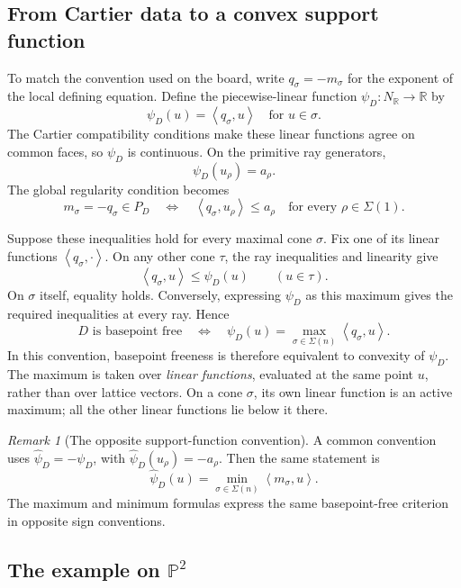 \documentclass[11pt]{article}
\theoremstyle{definition}
\theoremstyle{remark}
\newtheorem{Rmk}{Remark}
\newcommand{\Sg}{\Sigma}
\newcommand{\braket}[2]{\left\langle #1,#2\right\rangle}
\newcommand{\bP}{\mathbb{P}}
\newcommand{\bR}{\mathbb{R}}
\begin{document}
\subsection{From Cartier data to a convex support function}

To match the convention used on the board, write
\(q_\sigma=-m_\sigma\) for the exponent of the local defining equation.
Define the piecewise-linear function \(\psi_D:N_\bR\to\bR\) by
\[
    \psi_D(u)=\braket{q_\sigma}{u}
    \quad\text{for }u\in\sigma.
\]
The Cartier compatibility conditions make these linear functions agree
on common faces, so \(\psi_D\) is continuous. On the primitive ray
generators,
\[
    \psi_D(u_\rho)=a_\rho.
\]
The global regularity condition becomes
\[
    m_\sigma=-q_\sigma\in P_D
    \quad\Longleftrightarrow\quad
    \braket{q_\sigma}{u_\rho}\leq a_\rho
    \quad\text{for every }\rho\in\Sg(1).
\]

Suppose these inequalities hold for every maximal cone \(\sigma\).
Fix one of its linear functions \(\braket{q_\sigma}{\cdot}\).
On any other cone \(\tau\), the ray inequalities and linearity give
\[
    \braket{q_\sigma}{u}\leq\psi_D(u)
    \qquad(u\in\tau).
\]
On \(\sigma\) itself, equality holds. Conversely, expressing \(\psi_D\)
as this maximum gives the required inequalities at every ray. Hence
\[
    \boxed{D\text{ is basepoint free}
    \quad\Longleftrightarrow\quad
    \psi_D(u)=\max_{\sigma\in\Sg(n)}\braket{q_\sigma}{u}.}
\]
In this convention, basepoint freeness is therefore equivalent to
convexity of \(\psi_D\). The maximum is taken over \emph{linear
functions}, evaluated at the same point \(u\), rather than over lattice
vectors. On a cone \(\sigma\), its own linear function is an active
maximum; all the other linear functions lie below it there.

\begin{Rmk}[The opposite support-function convention]
    A common convention uses \(\widehat\psi_D=-\psi_D\), with
    \(\widehat\psi_D(u_\rho)=-a_\rho\). Then the same statement is
    \[
        \widehat\psi_D(u)=
        \min_{\sigma\in\Sg(n)}\braket{m_\sigma}{u}.
    \]
    The maximum and minimum formulas express the same basepoint-free
    criterion in opposite sign conventions.
\end{Rmk}

\subsection{The example on \(\bP^2\)}
\end{document}
